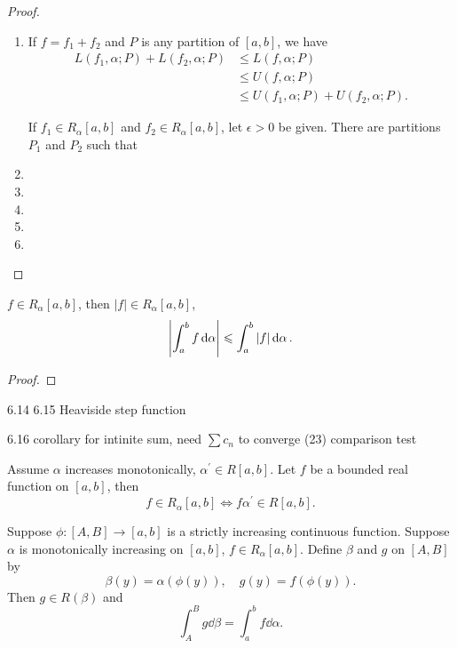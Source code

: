 \begin{proof} \
\begin{enumerate}[label=(\arabic*)]
\item If $f=f_1+f_2$ and $P$ is any partition of $[a,b]$, we have
\begin{align*}
L(f_1,\alpha;P)+L(f_2,\alpha;P)&\le L(f,\alpha;P)\\
&\le U(f,\alpha;P)\\
&\le U(f_1,\alpha;P)+U(f_2,\alpha;P).
\end{align*}

If $f_1\in R_\alpha[a,b]$ and $f_2\in R_\alpha[a,b]$, let $\epsilon>0$ be given. There are partitions $P_1$ and $P_2$ such that


\item 
\item 
\item 
\item 
\item 
\end{enumerate}
\end{proof}

\begin{theorem}
$f\in R_\alpha[a,b]$, then $|f|\in R_\alpha[a,b]$,
\[ \left|\int_a^bf\dd{\alpha}\right|\leqslant\int_a^b|f|\dd{\alpha}. \]
\end{theorem}

\begin{proof}

\end{proof}

6.14 6.15
Heaviside step function

6.16 corollary
for intinite sum, need $\sum c_n$ to converge
(23) comparison test

\begin{proposition}
Assume $\alpha$ increases monotonically, $\alpha^\prime\in R[a,b]$. Let $f$ be a bounded real function on $[a,b]$, then
\[f\in R_\alpha[a,b]\iff f\alpha^\prime\in R[a,b].\]
\end{proposition}

\begin{proposition}
Suppose $\phi:[A,B]\to[a,b]$ is a strictly increasing continuous function. Suppose $\alpha$ is monotonically increasing on $[a,b]$, $f\in R_\alpha[a,b]$. Define $\beta$ and $g$ on $[A,B]$ by
\[\beta(y)=\alpha(\phi(y)),\quad g(y)=f(\phi(y)).\]
Then $g\in R(\beta)$ and
\[\int_A^B g\dd{\beta}=\int_a^b f\dd{\alpha}.\]
\end{proposition}

